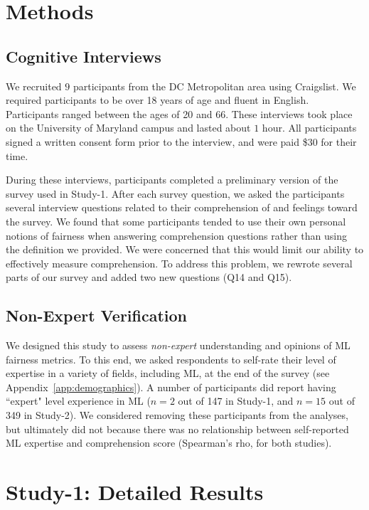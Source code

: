 \documentclass{article}
\newcommand{\studyA}{Study-1}
\newcommand{\studyB}{Study-2}
\newcommand{\Appref}[1]{Appendix~\ref{#1}}
\begin{document}
\section{Methods}
\subsection{Cognitive Interviews} \label{methods:design:cog}
We recruited $9$ participants from the DC Metropolitan area using Craigslist. We required participants to be over 18 years of age and fluent in English. Participants ranged between the ages of 20 and 66.
These interviews took place on the University of Maryland campus and lasted about $1$ hour. All participants signed a written consent form prior to the interview, and were paid \$30 for their time.

During these interviews, participants completed a preliminary version of the survey used in \studyA{}. 
After each survey question, we asked the participants several interview questions related to their comprehension of and feelings toward the survey. We found that some participants tended to use their own personal notions of fairness when answering comprehension questions rather than using the definition we provided. We were concerned that this would limit our ability to effectively measure comprehension. To address this problem, we rewrote several parts of our survey and added two new questions (Q14 and Q15).


\subsection{Non-Expert Verification}

We designed this study to assess \emph{non-expert} understanding and opinions of ML fairness metrics. To this end, we asked respondents to self-rate their level of expertise in a variety of fields, including ML, at the end of the survey (see \Appref{app:demographics}). A number of participants did report having ``expert" level experience in ML ($n = 2$ out of 147 in \studyA{}, and $n = 15$ out of 349 in \studyB{}). We considered removing these participants from the analyses, but ultimately did not because there was no relationship between self-reported ML expertise and comprehension score (Spearman's rho, for both studies). 



\section{\studyA{}: Detailed Results} \label{app:studyA_results}
\end{document}
